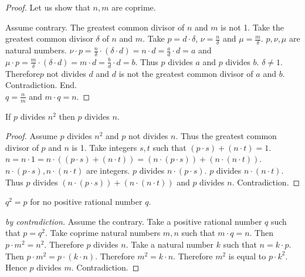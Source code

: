 \documentclass{article}
\begin{document}
\begin{forthel}
\begin{proof}
Let us show that $n,m$ are coprime. 

  Assume contrary. The greatest common divisor of $n$ and $m$ is not 1. Take the greatest common divisor $\delta$ of $n$ and $m$.
  Take $p = d \cdot \delta$, $\nu = \frac{n}{\delta}$ and $\mu = \frac{m}{\delta}$. $p,\nu,\mu$ are natural numbers.
  $\nu \cdot p = \frac{n}{\delta} \cdot (\delta \cdot d) = n \cdot d = \frac{a}{d} \cdot d = a$ and
  $\mu \cdot p = \frac{m}{\delta} \cdot (\delta \cdot d) = m \cdot d = \frac{b}{d} \cdot d = b$. 
  Thus $p$ divides $a$ and $p$ divides $b$. $\delta \neq 1$.
  Therefore$p$ not divides $d$ and $d$ is not the greatest common divisor of $a$ and $b$. Contradiction.
End.\\

$q = \frac{n}{m}$ and $m \cdot q = n$.
\end{proof}

    \begin{lemma}
      If $p$ divides $n^{2}$ then $p$ divides $n$. 
    \end{lemma}
    \begin{proof}
      Assume $p$ divides $n^{2}$ and $p$ not divides $n$. Thus the greatest common divisor of $p$ and $n$ is 1.
      Take integers $s,t$ such that $(p \cdot s) + (n \cdot t) = 1$.
      $n = n \cdot 1 = n \cdot ((p \cdot s) + (n \cdot t)) = (n \cdot (p \cdot s)) + (n \cdot (n \cdot t))$.
      $n \cdot (p \cdot s), n \cdot (n \cdot t)$ are integers.
      $p$ divides $n \cdot (p \cdot s)$. $p$ divides $n \cdot (n \cdot t)$.
      Thus $p$ divides $(n \cdot (p \cdot s)) + (n \cdot (n \cdot t))$ and $p$ divides $n$. Contradiction.
    \end{proof}


    \begin{proposition}
      $q^{2} = p$ for no positive rational number $q$.
    \end{proposition}
    \begin{proof}[by contradiction]
      Assume the contrary.
      Take a positive rational number $q$ such that $p = q^{2}$.
      Take coprime natural numbers $m,n$ such that $m \cdot q = n$.
      Then $p \cdot m^{2} = n^{2}$.
      Therefore $p$ divides $n$.
      Take a natural number $k$ such that $n = k \cdot p$.
      Then $p \cdot m^{2} = p \cdot (k \cdot n)$.
      Therefore $m^{2} = k \cdot n$.
      Therefore $m^{2}$ is equal to $p \cdot k^{2}$.
      Hence $p$ divides $m$.
      Contradiction.
    \end{proof}
  \end{forthel}
\end{document}
